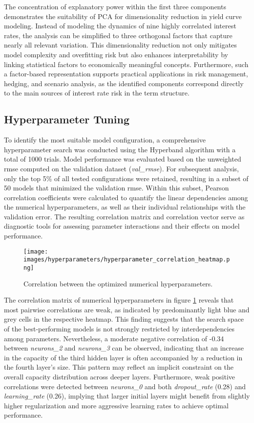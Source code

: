The concentration of explanatory power within the first three components demonstrates the suitability of PCA for dimensionality reduction in yield curve modeling. Instead of modeling the dynamics of nine highly correlated interest rates, the analysis can be simplified to three orthogonal factors that capture nearly all relevant variation. This dimensionality reduction not only mitigates model complexity and overfitting risk but also enhances interpretability by linking statistical factors to economically meaningful concepts. Furthermore, such a factor-based representation supports practical applications in risk management, hedging, and scenario analysis, as the identified components correspond directly to the main sources of interest rate risk in the term structure.

\subsection{Hyperparameter Tuning}
To identify the most suitable model configuration, a comprehensive hyperparameter search was conducted using the Hyperband algorithm with a total of 1000 trials. Model performance was evaluated based on the unweighted \ac{rmse} computed on the validation dataset (\textit{val\_rmse}). For subsequent analysis, only the top 5\% of all tested configurations were retained, resulting in a subset of 50 models that minimized the validation \ac{rmse}. Within this subset, Pearson correlation coefficients were calculated to quantify the linear dependencies among the numerical hyperparameters, as well as their individual relationships with the validation error. The resulting correlation matrix and correlation vector serve as diagnostic tools for assessing parameter interactions and their effects on model performance.

\begin{figure}[H]
	\centering
	\texttt{[image: images/hyperparameters/hyperparameter\_correlation\_heatmap.png]}
	\caption{Correlation between the optimized numerical hyperparameters.}
	\label{fig:hyperparameter_correlation}
\end{figure}

The correlation matrix of numerical hyperparameters in figure \ref{fig:hyperparameter_correlation} reveals that most pairwise correlations are weak, as indicated by predominantly light blue and grey cells in the respective heatmap. This finding suggests that the search space of the best-performing models is not strongly restricted by interdependencies among parameters. Nevertheless, a moderate negative correlation of -0.34 between \textit{neurons\_2} and \textit{neurons\_3} can be observed, indicating that an increase in the capacity of the third hidden layer is often accompanied by a reduction in the fourth layer's size. This pattern may reflect an implicit constraint on the overall capacity distribution across deeper layers. Furthermore, weak positive correlations were detected between \textit{neurons\_0} and both \textit{dropout\_rate} (0.28) and \textit{learning\_rate} (0.26), implying that larger initial layers might benefit from slightly higher regularization and more aggressive learning rates to achieve optimal performance.

